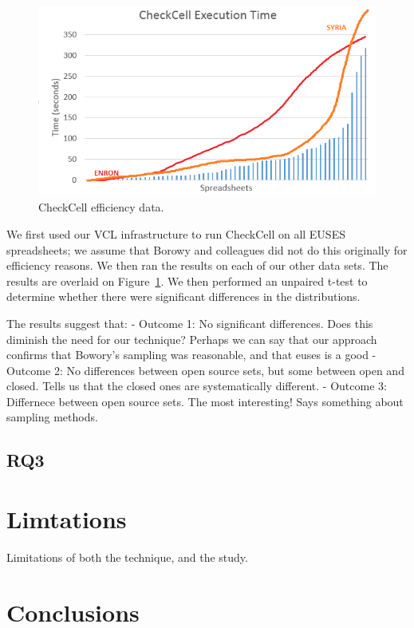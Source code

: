 \documentclass{sig-alternate} %
\begin{document}
\begin{figure}
\centering
\includegraphics[width=\columnwidth]{checkcell.png}
\caption{CheckCell efficiency data.}
\label{fig:effectiveness}
\end{figure}

We first used our VCL infrastructure to run CheckCell on all EUSES spreadsheets; we assume
that Borowy and colleagues did not do this originally for efficiency reasons.
We then ran the results on each of our other data sets.
The results are overlaid on Figure~\ref{fig:effectiveness}.
We then performed an unpaired t-test to determine whether there were significant differences
in the distributions.

The results suggest that:
- Outcome 1: No significant differences. Does this diminish the need for our technique?
	Perhaps we can say that our approach confirms that Bowory's sampling was reasonable,
	and that euses is a good 
- Outcome 2: No differences between open source sets, but some between open and closed. 
	Tells us that the closed ones are systematically different.
- Outcome 3: Differnece between open source sets. The most interesting! Says something about
	sampling methods.

\subsection{RQ3}

\section{Limtations}

Limitations of both the technique, and the study.

\section{Conclusions}
\end{document}
